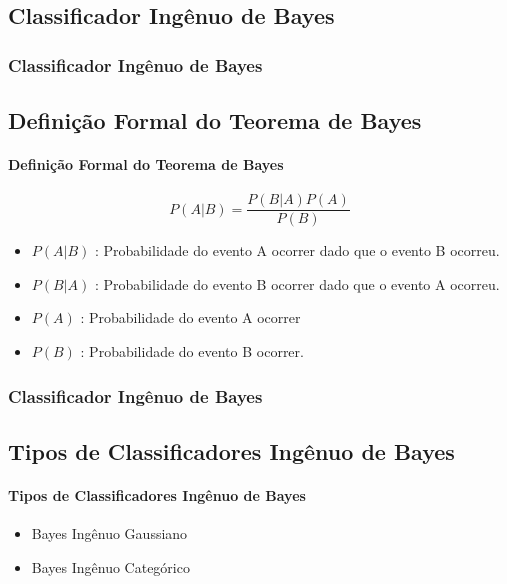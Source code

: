 \documentclass{beamer}
\begin{document}
\begin{frame}
\section{Classificador Ingênuo de Bayes}
\frametitle{Classificador Ingênuo de Bayes}
\subsection{Definição Formal do Teorema de Bayes}
\framesubtitle{Definição Formal do Teorema de Bayes}
\begin{equation}
    P(A|B) = \frac{P(B|A)P(A)}{P(B)}
\end{equation}

\begin{itemize}
\item $P(A|B)$ : Probabilidade do evento A ocorrer dado que o evento B ocorreu.
\item $P(B|A)$ : Probabilidade do evento B ocorrer dado que o evento A ocorreu.
\item $P(A)$   : Probabilidade do evento A ocorrer
\item $P(B)$   : Probabilidade do evento B ocorrer. 
\end{itemize}

\end{frame}

\begin{frame}
\frametitle{Classificador Ingênuo de Bayes}
\subsection{Tipos de Classificadores Ingênuo de Bayes}
\framesubtitle{Tipos de Classificadores Ingênuo de Bayes}
\begin{itemize}
\item Bayes Ingênuo Gaussiano
\item Bayes Ingênuo Categórico
\end{itemize}
\end{frame}
\end{document}
